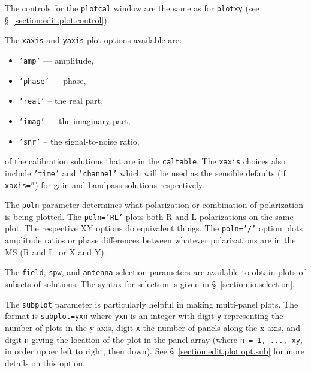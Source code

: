 The controls for the {\tt plotcal} window are the same as for
{\tt plotxy} (see \S~\ref{section:edit.plot.control}).

The {\tt xaxis} and {\tt yaxis} plot options available are:
\begin{itemize}
   \item {\tt 'amp'} --- amplitude,
   \item {\tt 'phase'} --- phase,
   \item {\tt 'real'} -- the real part,
   \item {\tt 'imag'} --- the imaginary part,
   \item {\tt 'snr'} -- the signal-to-noise ratio,
\end{itemize}
of the calibration solutions that are in the {\tt caltable}.
The {\tt xaxis} choices also include {\tt 'time'} and {\tt 'channel'}
which will be used as the sensible defaults (if {\tt xaxis=''}) for
gain and bandpass solutions respectively.

The {\tt poln} parameter determines what polarization or combination of
polarization is being plotted.  The {\tt poln='RL'} plots both
R and L polarizations on the same plot.  The respective XY options do
equivalent things.  The {\tt poln='/'} option
plots amplitude ratios or phase differences between whatever
polarizations are in the MS (R and L. or X and Y).  

The {\tt field}, {\tt spw}, and {\tt antenna} selection parameters are
available to obtain plots of subsets of solutions.  The syntax for 
selection is given in \S~\ref{section:io.selection}.

The {\tt subplot} parameter is particularly helpful in making 
multi-panel plots.  The format is  
{\tt subplot=yxn} where {\tt yxn} is an integer with digit
{\tt y} representing the number of plots in the y-axis, digit
{\tt x} the number of panels along the x-axis, and digit {\tt n}
giving the location of the plot in the panel array (where
{\tt n = 1, ..., xy}, in order upper left to right, then down).
See \S~\ref{section:edit.plot.opt.sub} for more details on this
option.

